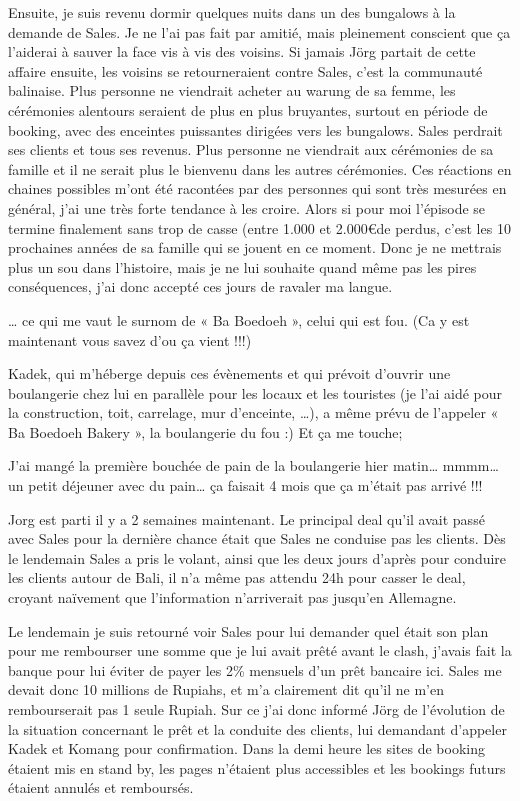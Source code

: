 Ensuite, je suis revenu dormir quelques nuits dans un des bungalows à la demande de Sales. Je ne l’ai pas fait par amitié, mais pleinement conscient que ça l’aiderai à sauver la face vis à vis des voisins. Si jamais Jörg partait de cette affaire ensuite, les voisins se retourneraient contre Sales, c’est la communauté balinaise. Plus personne ne viendrait acheter au warung de sa femme, les cérémonies alentours seraient de plus en plus bruyantes, surtout en période de booking, avec des enceintes puissantes dirigées vers les bungalows. Sales perdrait ses clients et tous ses revenus. Plus personne ne viendrait aux cérémonies de sa famille et il ne serait plus le bienvenu dans les autres cérémonies. Ces réactions en chaines possibles m’ont été racontées par des personnes qui sont très mesurées en général, j’ai une très forte tendance à les croire. Alors si pour moi l’épisode se termine finalement sans trop de casse (entre 1.000 et 2.000\euro  de perdus, c’est les 10 prochaines années de sa famille qui se jouent en ce moment. Donc je ne mettrais plus un sou dans l’histoire, mais je ne lui souhaite quand même pas les pires conséquences, j'ai donc accepté ces jours de ravaler ma langue.

… ce qui me vaut le surnom de « Ba Boedoeh », celui qui est fou. (Ca y est maintenant vous savez d’ou ça vient !!!)

Kadek, qui m’héberge depuis ces évènements et qui prévoit d’ouvrir une boulangerie chez lui en parallèle pour les locaux et les touristes (je l’ai aidé pour la construction, toit, carrelage, mur d’enceinte, …), a même prévu de l’appeler « Ba Boedoeh Bakery », la boulangerie du fou :) Et ça me touche;

J’ai mangé la première bouchée de pain de la boulangerie hier matin… mmmm… un petit déjeuner avec du pain… ça faisait 4 mois que ça m’était pas arrivé !!!

Jorg est parti il y a 2 semaines maintenant. Le principal deal qu’il avait passé avec Sales pour la dernière chance était que Sales ne conduise pas les clients. Dès le lendemain Sales a pris le volant, ainsi que les deux jours d’après pour conduire les clients autour de Bali, il n’a même pas attendu 24h pour casser le deal, croyant naïvement que l’information n’arriverait pas jusqu’en Allemagne.

Le lendemain je suis retourné voir Sales pour lui demander quel était son plan pour me rembourser une somme que je lui avait prêté avant le clash, j’avais fait la banque pour lui éviter de payer les 2\% mensuels d’un prêt bancaire ici. Sales me devait donc 10 millions de Rupiahs, et m’a clairement dit qu’il ne m’en rembourserait pas 1 seule Rupiah. Sur ce j’ai donc informé Jörg de l’évolution de la situation concernant le prêt et la conduite des clients, lui demandant d’appeler Kadek et Komang pour confirmation. Dans la demi heure les sites de booking étaient mis en stand by, les pages n’étaient plus accessibles et les bookings futurs étaient annulés et remboursés.

